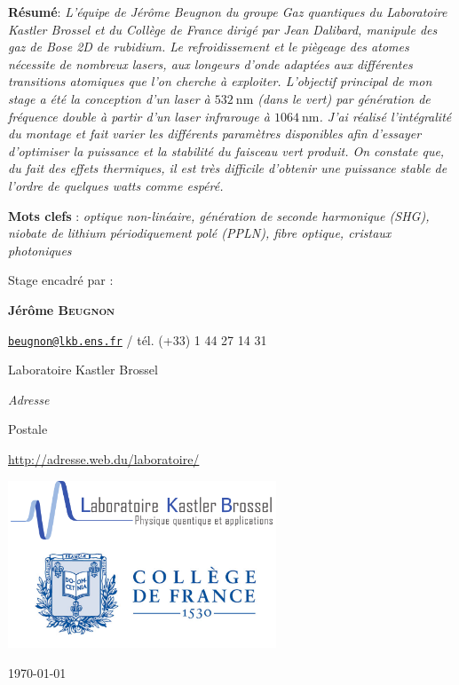 \documentclass[11pt,a4paper] { article}
\newcommand{\lmbd}[1]{$\SI{#1}{\nano\metre}$}
\begin{document}
\begin{@empty}
\begin{center}
\parbox{15cm}{\small
	\textbf{R\'esum\'e}: \it L'équipe de Jérôme Beugnon du groupe Gaz quantiques du Laboratoire Kastler Brossel et du Collège de France dirigé par Jean Dalibard, manipule des gaz de Bose 2D de rubidium. Le refroidissement et le piègeage des atomes nécessite de nombreux lasers, aux longeurs d'onde adaptées aux différentes transitions atomiques que l'on cherche à exploiter.
	L'objectif principal de mon stage a été la conception d'un laser à $\SI{532}{\nano\metre}$ (dans le vert) par génération de fréquence double à partir d'un laser infrarouge à \lmbd{1064}. J'ai réalisé l'intégralité du montage et fait varier les différents paramètres disponibles afin d'essayer d'optimiser la puissance et la stabilité du faisceau vert produit. On constate que, du fait des effets thermiques, il est très difficile d'obtenir une puissance stable de l'ordre de quelques watts comme espéré. 
\vspace{0.5cm}
} 


\vspace{0.5cm}

\parbox{15cm}{
\textbf{Mots clefs} : \it optique non-linéaire, génération de seconde harmonique (SHG), niobate de lithium périodiquement polé (PPLN), fibre optique, cristaux photoniques}%

\vspace{0.5cm}

\parbox{15cm}{
Stage encadr\'e par :

{\bf Jérôme \textsc{Beugnon}}

\href{mailto:beugnon@lkb.ens.fr}{\tt beugnon@lkb.ens.fr} / t\'el. (+33) 1 44 27 14 31


Laboratoire Kastler Brossel

{\it Adresse

Postale}

\url{http://adresse.web.du/laboratoire/}
} 

\vspace{0.5cm}

\includegraphics[height=5cm]{./img/logos.png}

\end{center}

\vfill
\hfill \today

\end{@empty}
\end{document}
